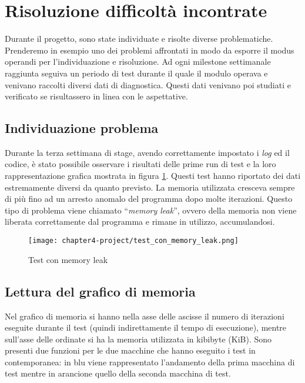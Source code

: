 \section{Risoluzione difficoltà incontrate}

Durante il progetto, sono state individuate e risolte diverse problematiche. Prenderemo in esempio uno dei problemi affrontati in modo da esporre il modus operandi per l’individuazione e risoluzione.
Ad ogni milestone settimanale raggiunta seguiva un periodo di test durante il quale il modulo operava e venivano raccolti diversi dati di diagnostica. Questi dati venivano poi studiati e verificato se risultassero in linea con le aspettative.

\subsection{Individuazione problema}
Durante la terza settimana di stage, avendo correttamente impostato i \emph{log} ed il codice, è stato possibile osservare i risultati delle prime run di test e la loro rappresentazione grafica mostrata in figura \ref{fig:test con memory leak}. Questi test hanno riportato dei dati estremamente diversi da quanto previsto. La memoria utilizzata cresceva sempre di più fino ad un arresto anomalo del programma dopo molte iterazioni. Questo tipo di problema viene chiamato ``\emph{memory leak}'', ovvero della memoria non viene liberata correttamente dal programma e rimane in utilizzo, accumulandosi.

\begin{figure}[!h] 
    \centering 
    \texttt{[image: chapter4-project/test\_con\_memory\_leak.png]} 
    \caption{Test con memory leak}
    \label{fig:test con memory leak}
\end{figure}

\subsection{Lettura del grafico di memoria} \label{subsec:lettura grafico di memoria}
Nel grafico di memoria si hanno nella asse delle ascisse il numero di iterazioni eseguite durante il test (quindi indirettamente il tempo di esecuzione), mentre sull'asse delle ordinate si ha la memoria utilizzata in kibibyte (KiB). Sono presenti due funzioni per le due macchine che hanno eseguito i test in contemporanea: in blu viene rappresentato l'andamento della prima macchina di test mentre in arancione quello della seconda macchina di test.

